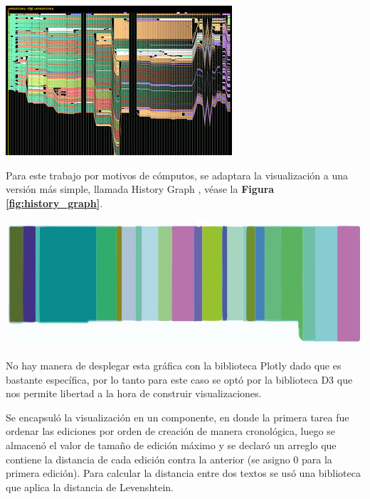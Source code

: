 \begin{enumerate}
  \begin{center}
      \bigbreak
      \includegraphics{images/marco_aplicativo/history_flow_original.png}
      \label{fig:history_flow_original}
      \bigbreak
  \end{center}
  
  Para este trabajo por motivos de cómputos, se adaptara la visualización a una versión más simple, llamada History Graph \cite{HistoryGraph}, véase la \textbf{Figura \ref{fig:history_graph}}.
  
  \begin{center}
      \bigbreak
      \includegraphics{images/marco_aplicativo/history_graph.png}
      \label{fig:history_graph}
      \bigbreak
  \end{center}
  
  No hay manera de desplegar esta gráfica con la biblioteca Plotly dado que es bastante específica, por lo tanto para este caso se optó por la biblioteca D3 que nos permite libertad a la hora de construir visualizaciones.
  
  Se encapsuló la visualización en un componente, en donde la primera tarea fue ordenar las ediciones por orden de creación de manera cronológica, luego se almacenó el valor de tamaño de edición máximo y se declaró un arreglo que contiene la distancia de cada edición contra la anterior (se asigno 0 para la primera edición). Para calcular la distancia entre dos textos se usó una biblioteca que aplica la distancia de Levenshtein.
  

\end{enumerate}

